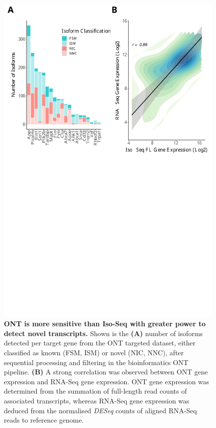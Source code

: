 \begin{figure}[!htp]
	\begin{center}
		\includegraphics[page=2,trim={0 19cm 0 0cm},clip,scale = 0.60]{Figures/ONTvsIsoSeq.pdf}
	\end{center}
	\captionsetup{width=0.95\textwidth}
	\caption[Isoform landscape of AD-risk genes from ONT targeted profiling]%
	{\textbf{ONT is more sensitive than Iso-Seq with greater power to detect novel transcripts.} Shown is the \textbf{(A)} number of isoforms detected per target gene from the ONT targeted dataset, either classified as known (FSM, ISM) or novel (NIC, NNC), after sequential processing and filtering in the bioinformatics ONT pipeline. \textbf{(B)} A strong correlation was observed between ONT gene expression and RNA-Seq gene expression. ONT gene expression was determined from the summation of full-length read counts of associated transcripts, whereas RNA-Seq gene expression was deduced from the normalised \textit{DESeq} counts of aligned RNA-Seq reads to reference genome\cite{Castanho2020}.}
	\label{fig:ont_targeted_finalnumberiso}
\end{figure}

